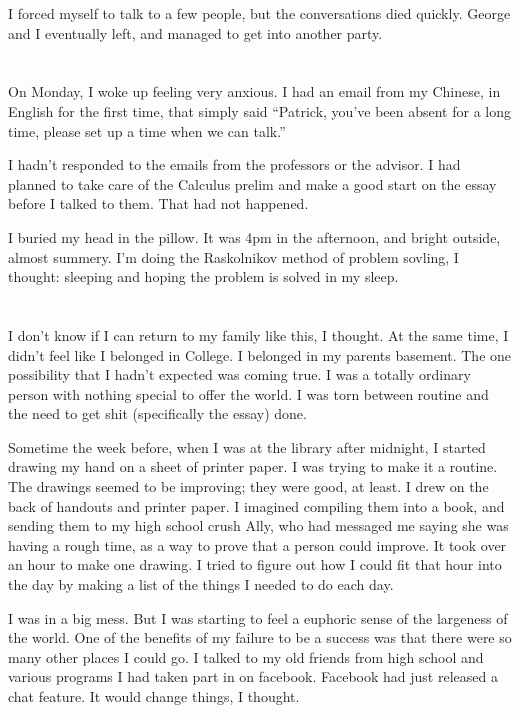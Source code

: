 I forced myself to talk to a few people, but the conversations died quickly.
George and I eventually left, and managed to get into another party.

\section{}
On Monday, I woke up feeling very anxious.  I had an email from my
Chinese, in English for the first time, that simply said ``Patrick, you've been
absent for a long time, please set up a time when we can talk.''

I hadn't responded to the emails from the professors or the advisor.  I had
planned to take care of the Calculus prelim and make a good start on the essay
before I talked to them.  That had not happened.

I buried my head in the pillow.  It was 4pm in the afternoon, and bright
outside, almost summery.  I'm doing the Raskolnikov method of problem sovling, I
thought: sleeping and hoping the problem is solved in my sleep.

\section{}

I don't know if I can return to my family like this, I thought.  At the same
time, I didn't feel like I belonged in College.  I belonged in my parents
basement.  The one possibility that I hadn't expected was coming true.  I was a
totally ordinary person with nothing special to offer the world.  I was torn
between routine and the need to get shit (specifically the essay) done.    

Sometime the week before, when I was at the library after midnight, I started
drawing my hand on a sheet of printer paper.  I was trying to make it a routine.
The drawings seemed to be improving; they were good, at least.  I drew on the
back of handouts and printer paper.  I imagined compiling them into a book, and
sending them to my high school crush Ally, who had messaged me saying she was
having a rough time, as a way to prove that a person could improve.  It took
over an hour to make one drawing.  I tried to figure out how I could fit that
hour into the day by making a list of the things I needed to do each day. 

I was in a big mess.  But I was starting to feel a euphoric sense of the
largeness of the world.  One of the benefits of my failure to be a success was
that there were so many other places I could go.  I talked to my old friends
from high school and various programs I had taken part in on facebook.  Facebook
had just released a chat feature.  It would change things, I thought.

